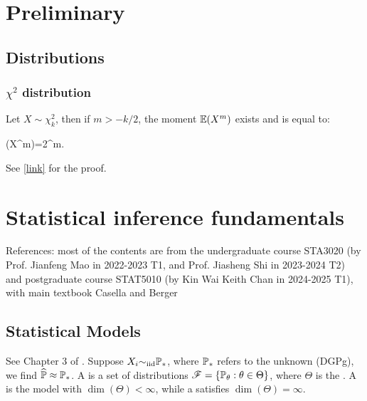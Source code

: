 \documentclass[10pt,a4paper]{book}
\begin{document}
	\MakeScribeTop
	\tableofcontents


\chapter{Preliminary}\label{chap:premi}
\section{Distributions}
\subsection{$\chi^2$ distribution}
Let $X\sim\chi_k^2$, then if $m>-k/2$, the moment $\mathbb E(X^m)$ exists and is equal to:
\begin{sequation}\label{eq:chi2_moment}
	\bbE(X^m)=2^m.
\end{sequation}  
See \href{https://statproofbook.github.io/P/chi2-mom.html}{[link]} for the proof.

\chapter{Statistical inference fundamentals}\label{chap:stat-inf}

References: most of the contents are from the undergraduate course STA3020 (by Prof. Jianfeng Mao in 2022-2023 T1, and Prof. Jiasheng Shi in 2023-2024 T2) and postgraduate course STAT5010 (by Kin Wai Keith Chan in 2024-2025 T1), with main textbook Casella and Berger \cite{casella2002statistical} 


\section{Statistical Models}
See Chapter 3 of \cite{casella2002statistical}. Suppose $X_i{\sim}_{\mathrm{iid}} \mathbb P_*$, where $\mathbb P_*$ refers to the unknown  (DGPg), we find $\widehat{\mathbb P}\approx \mathbb P_*$. A  is a set of distributions $\mathscr{F}=\{\mathbb P_{\theta}:\theta\in\Theta\}$, where $\Theta$ is the . A  is the model with $\dim(\Theta)<\infty$, while a  satisfies $\dim(\Theta)=\infty$. 
\end{document}
